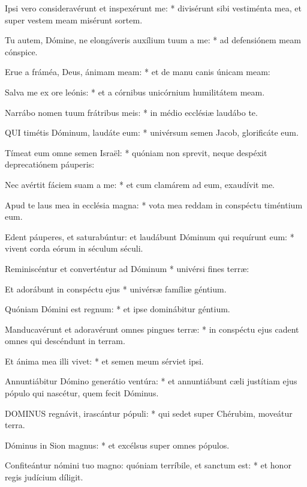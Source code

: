 Ipsi vero consideravérunt et inspexérunt me: * divisérunt sibi vestiménta mea, et super vestem meam misérunt sortem.

Tu autem, Dómine, ne elongáveris auxílium tuum a me: * ad defensiónem meam cónspice.

Erue a fráméa, Deus, ánimam meam: * et de manu canis únicam meam:

Salva me ex ore leónis: * et a córnibus unicórnium humilitátem meam.

Narrábo nomen tuum frátribus meis: * in médio ecclésiæ laudábo te.


\lettrine[lines=2]{Q}{UI} timétis Dóminum, laudáte eum: * univérsum semen Jacob, glorificáte eum.

Tímeat eum omne semen Israël: * quóniam non sprevit, neque despéxit deprecatiónem páuperis:

Nec avértit fáciem suam a me: * et cum clamárem ad eum, exaudívit me.

Apud te laus mea in ecclésia magna: * vota mea reddam in conspéctu timéntium eum.

Edent páuperes, et saturabúntur: et laudábunt Dóminum qui requírunt eum: * vivent corda eórum in séculum séculi.

Reminiscéntur et converténtur ad Dóminum * univérsi fines terræ:

Et adorábunt in conspéctu ejus * univérsæ famíliæ géntium.

Quóniam Dómini est regnum: * et ipse dominábitur géntium.

Manducavérunt et adoravérunt omnes pingues terræ: * in conspéctu ejus cadent omnes qui descéndunt in terram.

Et ánima mea illi vivet: * et semen meum sérviet ipsi.

Annuntiábitur Dómino generátio ventúra: * et annuntiábunt cæli justítiam ejus pópulo qui nascétur, quem fecit Dóminus.



\lettrine[lines=2]{D}{OMINUS} regnávit, irascántur pópuli: * qui sedet super Chérubim, moveátur terra.

Dóminus in Sion magnus: * et excélsus super omnes pópulos.

Confiteántur nómini tuo magno: quóniam terríbile, et sanctum est: * et honor regis judícium díligit.

